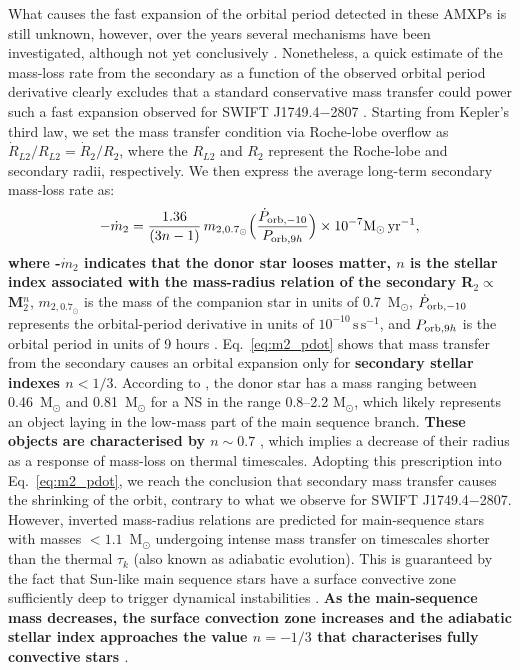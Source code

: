 \documentclass[fleqn,usenatbib]{mnras}
\newcommand{\swiftj}{SWIFT J1749.4$-$2807}
\begin{document}
What causes the fast expansion of the orbital period detected in these AMXPs is still unknown, however, over the years several mechanisms have been investigated, although not yet conclusively \citep[see e.g.,][]{di-Salvo:2008uu, Hartman:2008uj,Burderi:2009td, Patruno:2012tw, Sanna:2017vj, Sanna:2018tx}. Nonetheless, a quick estimate of the mass-loss rate from the secondary as a function of the observed orbital period derivative clearly excludes that a standard conservative mass transfer could power such a fast expansion observed for \swiftj{} \citep[similar conclusions have been drawn for SAX J1808.4$-$3658, see e.g.,][]{Sanna:2017vj}. Starting from Kepler's third law, we set the mass transfer condition via Roche-lobe overflow as $\dot{R}_{L2}/R_{L2}=\dot{R}_2/R_{2}$, where the $R_{L2}$ and $R_{2}$ represent the Roche-lobe and secondary radii, respectively. We then express the average long-term secondary mass-loss rate as: 
\begin{eqnarray}
\label{eq:m2_pdot}
-\dot{m}_{2}=\frac{1.36}{(3n-1)}\,m_{2,0.7_{\odot{}}}\Big(\frac{\dot{P}_{{\rm orb},-10}}{P_{{\rm orb},9h}}\Big)\times 10^{-7} \text{M}_{\odot}\, \text{yr}^{-1},
\end{eqnarray}
\textbf{where -$\dot{m}_{2}$ indicates that the donor star looses matter, $n$ is the stellar index associated with the mass-radius relation of the secondary R$_2\propto$ M$_2^n$}, $m_{2,0.7_\odot{}}$ is the mass of the companion star in units of 0.7~M$_{\odot}$, $\dot{P}_{{\rm orb},-10}$ represents the orbital-period derivative in units of $10^{-10}\,\text{s}\,\text{s}^{-1}$, and $P_{{\rm orb},9h}$ is the orbital period in units of 9 hours \citep[see e.g.,][for more details on the derivation of the expression]{Burderi:2010tk}. Eq.~\ref{eq:m2_pdot} shows that mass transfer from the secondary causes an orbital expansion only for \textbf{secondary stellar indexes $n<1/3$}. According to \citet{Markwardt:2010tl}, the donor star has a mass ranging between 0.46~M$_\odot$ and 0.81~M$_\odot$ for a NS in the range 0.8--2.2 M$_\odot$, which likely represents an object laying in the low-mass part of the main sequence branch. \textbf{These objects are characterised by $n \sim 0.7$} \citep[see e.g.,][]{Chabrier:2009vh}, which implies a decrease of their radius as a response of mass-loss on thermal timescales. Adopting this prescription into Eq.~\ref{eq:m2_pdot}, we reach the conclusion that secondary mass transfer causes the shrinking of the orbit, contrary to what we observe for \swiftj{}. However, inverted mass-radius relations are predicted for main-sequence stars with masses $<1.1$~M$_{\odot}$ undergoing intense mass transfer on timescales shorter than the thermal $\tau_k$ (also known as adiabatic evolution). This is guaranteed by the fact that Sun-like main sequence stars have a surface convective zone sufficiently deep to trigger dynamical instabilities \citep[see e.g.,][]{Ge:2015ug}. \textbf{As the main-sequence mass decreases, the surface convection zone increases and the adiabatic stellar index approaches the value $n=-1/3$ that characterises fully convective stars \citep[well described with a polytrope index 3/2, see e.g.,][]{Rappaport:1982vc}}. 
\end{document}
